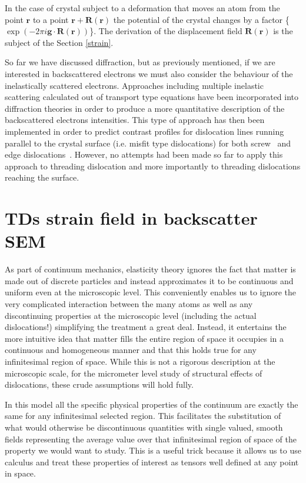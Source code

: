 In the case of crystal subject to a deformation that moves an atom from the point $\textbf{r}$ to a point $\textbf{r}+\textbf{R}(\textbf{r})$ the potential of the crystal changes by a factor \{$\exp(-2\pi i \textbf{g}\cdot \textbf{R}(\textbf{r}))$\}. The derivation of the displacement field $\textbf{R}(\textbf{r})$ is the subject of the Section \ref{strain}.

So far we have discussed diffraction, but as previously mentioned, if we are interested in backscattered electrons we must also consider the behaviour of the inelastically scattered electrons. Approaches including multiple inelastic scattering calculated out of transport type equations\cite{Spencer72, Spencer80} have been incorporated into diffraction theories in order to produce a more quantitative description of the backscattered electrons intensities. This type of approach has then been implemented in order to predict contrast profiles for dislocation lines running parallel to the crystal surface (i.e. misfit type dislocations) for both screw~\cite{Spencer72} and edge dislocations~\cite{Wilkinson95}. However, no attempts had been made so far to apply this approach to threading dislocation and more importantly to threading dislocations reaching the surface.


 
 \section{TDs strain field in backscatter SEM}
 As part of continuum mechanics, elasticity theory ignores the fact that matter is made out of discrete particles and instead approximates it to be continuous and uniform even at the microscopic level. This conveniently enables us to ignore the very complicated interaction between the many atoms as well as any discontinuing properties at the microscopic level (including the actual dislocations!) simplifying the treatment a great deal. Instead, it entertains the more intuitive idea that matter fills the entire region of space it occupies in a continuous and homogeneous manner and that this holds true for any infinitesimal region of space. While this is not a rigorous description at the microscopic scale, for the micrometer level study of structural effects of dislocations, these crude assumptions will hold fully.

In this model all the specific physical properties of the continuum are exactly the same for
any infinitesimal selected region. This facilitates the substitution of what would otherwise be discontinuous quantities with single valued, smooth fields representing the average value over that infinitesimal region of space of the property we would want to study. This is a useful trick because it allows us to use calculus and treat these properties of interest as tensors well defined at any point in space.


